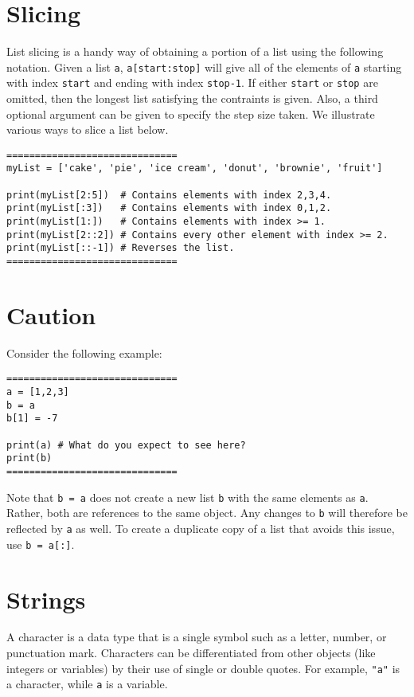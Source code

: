 \documentclass{ximera}
\begin{document}
\section{Slicing}

List slicing is a handy way of obtaining a portion of a list using the following notation. Given a list \verb|a|, \verb|a[start:stop]| will give all of the elements of \verb|a| starting with index \verb|start| and ending with index \verb|stop-1|. If either \verb|start| or \verb|stop| are omitted, then the longest list satisfying the contraints is given. Also, a third optional argument can be given to specify the step size taken. We illustrate various ways to slice a list below.

\begin{verbatim}
==============================
myList = ['cake', 'pie', 'ice cream', 'donut', 'brownie', 'fruit']

print(myList[2:5])  # Contains elements with index 2,3,4.
print(myList[:3])   # Contains elements with index 0,1,2.
print(myList[1:])   # Contains elements with index >= 1.
print(myList[2::2]) # Contains every other element with index >= 2.
print(myList[::-1]) # Reverses the list.
==============================
\end{verbatim}

\section{Caution}

Consider the following example:

\begin{verbatim}
==============================
a = [1,2,3]
b = a
b[1] = -7

print(a) # What do you expect to see here?
print(b)
==============================
\end{verbatim}

Note that \verb|b = a| does not create a new list \verb|b| with the same elements as \verb|a|. Rather, both are references to the same object. Any changes to \verb|b| will therefore be reflected by \verb|a| as well. To create a duplicate copy of a list that avoids this issue, use \verb|b = a[:]|.

\section{Strings}

A character is a data type that is a single symbol such as a letter, number, or punctuation mark. Characters can be differentiated from other objects (like integers or variables) by their use of single or double quotes. For example, \verb|"a"| is a character, while \verb|a| is a variable.
\end{document}
